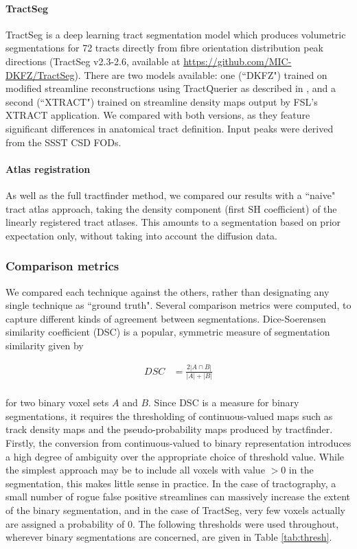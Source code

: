 \paragraph{TractSeg}

TractSeg \autocite{Wasserthal2018} is a deep learning tract segmentation model which produces volumetric segmentations for 72 tracts directly from fibre orientation distribution peak directions (TractSeg v2.3-2.6, available at \url{https://github.com/MIC-DKFZ/TractSeg}).
There are two models available: one (``DKFZ") trained on modified streamline reconstructions using TractQuerier \autocite{Wassermann2016} as described in \textcite{Wasserthal2018}, and a second (``XTRACT") trained on streamline density maps output by FSL's XTRACT application. \autocite{Warrington2020}
We compared with both versions, as they feature significant differences in anatomical tract definition.
Input peaks were derived from the SSST CSD FODs.

\paragraph{Atlas registration}

As well as the full tractfinder method, we compared our results with a ``naive" tract atlas approach, taking the density component (first SH coefficient) of the linearly registered tract atlases.
This amounts to a segmentation based on prior expectation only, without taking into account the diffusion data.

\subsubsection{Comparison metrics}

We compared each technique against the others, rather than designating any single technique as ``ground truth".
Several comparison metrics were computed, to capture different kinds of agreement between segmentations.
Dice-Soerensen similarity coefficient (DSC) \autocite{Dice1945} is a popular, symmetric measure of segmentation similarity given by

\begin{align}
  DSC &= \frac{2 |A \cap B|}{|A| + |B|} \\
\end{align}

for two binary voxel sets $A$ and $B$.
Since DSC is a measure for binary segmentations, it requires the thresholding of continuous-valued maps such as track density maps and the pseudo-probability maps produced by tractfinder.
Firstly, the conversion from continuous-valued to binary representation introduces a high degree of ambiguity over the appropriate choice of threshold value.
While the simplest approach may be to include all voxels with value $>0$ in the segmentation, this makes little sense in practice.
In the case of tractography, a small number of rogue false positive streamlines can massively increase the extent of the binary segmentation, and in the case of TractSeg, very few voxels actually are assigned a probability of 0.
The following thresholds were used throughout, wherever binary segmentations are concerned, are given in Table \ref{tab:thresh}.


